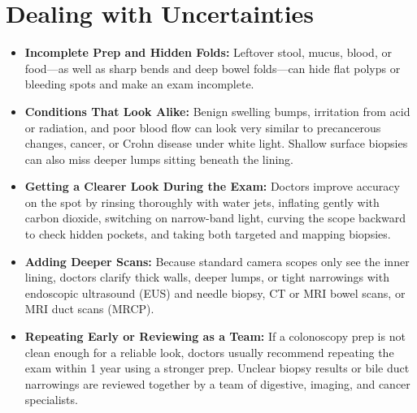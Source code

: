 \section{Dealing with Uncertainties}
\begin{itemize}
\item \textbf{Incomplete Prep and Hidden Folds:} Leftover stool, mucus, blood, or food---as well as sharp bends and deep bowel folds---can hide flat polyps or bleeding spots and make an exam incomplete.
\item \textbf{Conditions That Look Alike:} Benign swelling bumps, irritation from acid or radiation, and poor blood flow can look very similar to precancerous changes, cancer, or Crohn disease under white light. Shallow surface biopsies can also miss deeper lumps sitting beneath the lining.
\item \textbf{Getting a Clearer Look During the Exam:} Doctors improve accuracy on the spot by rinsing thoroughly with water jets, inflating gently with carbon dioxide, switching on narrow-band light, curving the scope backward to check hidden pockets, and taking both targeted and mapping biopsies.
\item \textbf{Adding Deeper Scans:} Because standard camera scopes only see the inner lining, doctors clarify thick walls, deeper lumps, or tight narrowings with endoscopic ultrasound (EUS) and needle biopsy, CT or MRI bowel scans, or MRI duct scans (MRCP).
\item \textbf{Repeating Early or Reviewing as a Team:} If a colonoscopy prep is not clean enough for a reliable look, doctors usually recommend repeating the exam within 1 year using a stronger prep. Unclear biopsy results or bile duct narrowings are reviewed together by a team of digestive, imaging, and cancer specialists.
\end{itemize}


